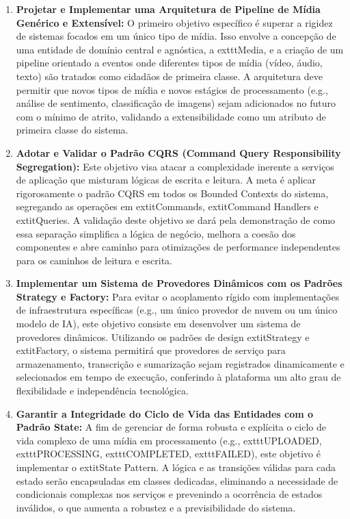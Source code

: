 \begin{enumerate}
    \item \textbf{Projetar e Implementar uma Arquitetura de Pipeline de Mídia Genérico e Extensível:} O primeiro objetivo específico é superar a rigidez de sistemas focados em um único tipo de mídia. Isso envolve a concepção de uma entidade de domínio central e agnóstica, a 	exttt{Media}, e a criação de um pipeline orientado a eventos onde diferentes tipos de mídia (vídeo, áudio, texto) são tratados como cidadãos de primeira classe. A arquitetura deve permitir que novos tipos de mídia e novos estágios de processamento (e.g., análise de sentimento, classificação de imagens) sejam adicionados no futuro com o mínimo de atrito, validando a extensibilidade como um atributo de primeira classe do sistema.

    \item \textbf{Adotar e Validar o Padrão CQRS (Command Query Responsibility Segregation):} Este objetivo visa atacar a complexidade inerente a serviços de aplicação que misturam lógicas de escrita e leitura. A meta é aplicar rigorosamente o padrão CQRS em todos os Bounded Contexts do sistema, segregando as operações em 	extit{Commands}, 	extit{Command Handlers} e 	extit{Queries}. A validação deste objetivo se dará pela demonstração de como essa separação simplifica a lógica de negócio, melhora a coesão dos componentes e abre caminho para otimizações de performance independentes para os caminhos de leitura e escrita.

    \item \textbf{Implementar um Sistema de Provedores Dinâmicos com os Padrões Strategy e Factory:} Para evitar o acoplamento rígido com implementações de infraestrutura específicas (e.g., um único provedor de nuvem ou um único modelo de IA), este objetivo consiste em desenvolver um sistema de provedores dinâmicos. Utilizando os padrões de design 	extit{Strategy} e 	extit{Factory}, o sistema permitirá que provedores de serviço para armazenamento, transcrição e sumarização sejam registrados dinamicamente e selecionados em tempo de execução, conferindo à plataforma um alto grau de flexibilidade e independência tecnológica.

    \item \textbf{Garantir a Integridade do Ciclo de Vida das Entidades com o Padrão State:} A fim de gerenciar de forma robusta e explícita o ciclo de vida complexo de uma mídia em processamento (e.g., 	exttt{UPLOADED}, 	exttt{PROCESSING}, 	exttt{COMPLETED}, 	exttt{FAILED}), este objetivo é implementar o 	extit{State Pattern}. A lógica e as transições válidas para cada estado serão encapsuladas em classes dedicadas, eliminando a necessidade de condicionais complexas nos serviços e prevenindo a ocorrência de estados inválidos, o que aumenta a robustez e a previsibilidade do sistema.


\end{enumerate}
